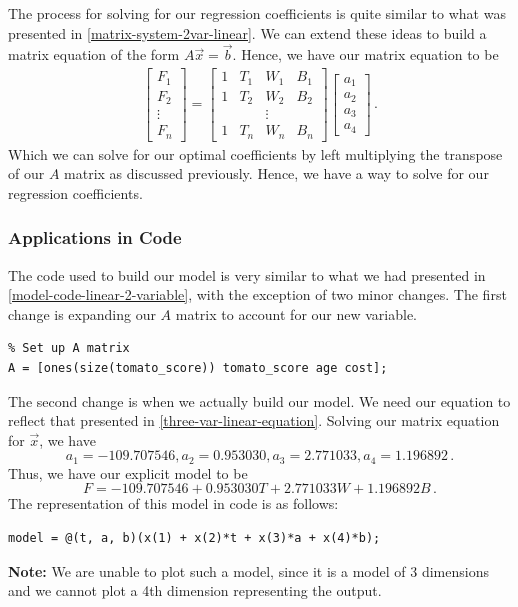 \documentclass[11pt]{article}
\begin{document}
The process for solving for our regression coefficients is quite similar to what was presented in \ref{matrix-system-2var-linear}.  
We can extend these ideas to build a matrix equation of the form $A \overrightarrow{x} = \overrightarrow{b}$.  Hence, we have our matrix equation to be
\label{matrix-system-3var-linear}
\begin{align*}
    \begin{bmatrix}
        F_1\\
        F_2 \\
        \vdots \\
        F_n
    \end{bmatrix}
    =
    \begin{bmatrix}
        1 & T_1 & W_1 & B_1 \\
        1 & T_2 & W_2 & B_2 \\
        & & \vdots & \\
        1 & T_n & W_n & B_n
    \end{bmatrix} 
    \begin{bmatrix}
        a_1 \\
        a_2 \\
        a_3 \\
        a_4
    \end{bmatrix} \, .
\end{align*}
Which we can solve for our optimal coefficients by left multiplying the transpose of our $A$ matrix as discussed previously.  
Hence, we have a way to solve for our regression coefficients.
\subsubsection{Applications in Code}
The code used to build our model is very similar to what we had presented in \ref{model-code-linear-2-variable}, with the exception of two minor changes.  The first change is expanding our $A$ matrix to account for our new variable.
\begin{lstlisting}
% Set up A matrix
A = [ones(size(tomato_score)) tomato_score age cost];
\end{lstlisting}
The second change is when we actually build our model.  We need our equation to reflect that presented in \ref{three-var-linear-equation}.  
Solving our matrix equation for $\overrightarrow{x}$, we have
\[ a_1 = -109.707546, a_2 = 0.953030, a_3 = 2.771033, a_4 = 1.196892 \, .\]
Thus, we have our explicit model to be
\[ F = -109.707546 + 0.953030 T + 2.771033 W + 1.196892 B \, .\]
The representation of this model in code is as follows:
\begin{lstlisting}
model = @(t, a, b)(x(1) + x(2)*t + x(3)*a + x(4)*b);
\end{lstlisting}
\textbf{Note:} We are unable to plot such a model, since it is a model of 3 dimensions and we cannot plot a 4th dimension representing the output.
\end{document}
